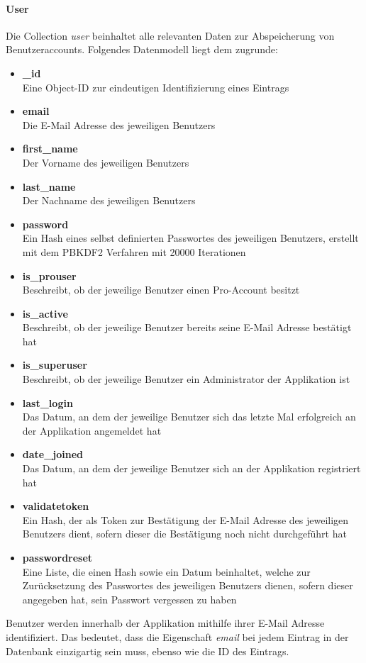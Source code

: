 \paragraph{User}
Die Collection \textit{user} beinhaltet alle relevanten Daten zur Abspeicherung von Benutzeraccounts. Folgendes Datenmodell liegt dem zugrunde:
\begin{itemize}
\item \textbf{\_id}\\ Eine Object-ID zur eindeutigen Identifizierung eines Eintrags
\item \textbf{email}\\ Die E-Mail Adresse des jeweiligen Benutzers
\item \textbf{first\_name}\\ Der Vorname des jeweiligen Benutzers
\item \textbf{last\_name}\\ Der Nachname des jeweiligen Benutzers
\item \textbf{password}\\ Ein Hash eines selbst definierten Passwortes des jeweiligen Benutzers, erstellt mit dem \gls{PBKDF2} Verfahren mit 20000 Iterationen
\item \textbf{is\_prouser}\\ Beschreibt, ob der jeweilige Benutzer einen Pro-Account besitzt
\item \textbf{is\_active}\\ Beschreibt, ob der jeweilige Benutzer bereits seine E-Mail Adresse bestätigt hat
\item \textbf{is\_superuser}\\ Beschreibt, ob der jeweilige Benutzer ein Administrator der Applikation ist
\item \textbf{last\_login}\\ Das Datum, an dem der jeweilige Benutzer sich das letzte Mal erfolgreich an der Applikation angemeldet hat
\item \textbf{date\_joined}\\ Das Datum, an dem der jeweilige Benutzer sich an der Applikation registriert hat
\item \textbf{validatetoken}\\ Ein Hash, der als Token zur Bestätigung der E-Mail Adresse des jeweiligen Benutzers dient, sofern dieser die Bestätigung noch nicht durchgeführt hat
\item \textbf{passwordreset}\\ Eine Liste, die einen Hash sowie ein Datum beinhaltet, welche zur Zurücksetzung des Passwortes des jeweiligen Benutzers dienen, sofern dieser angegeben hat, sein Passwort vergessen zu haben
\end{itemize}
Benutzer werden innerhalb der Applikation mithilfe ihrer E-Mail Adresse identifiziert. Das bedeutet, dass die Eigenschaft \textit{email} bei jedem Eintrag in der Datenbank einzigartig sein muss, ebenso wie die ID des Eintrags.


